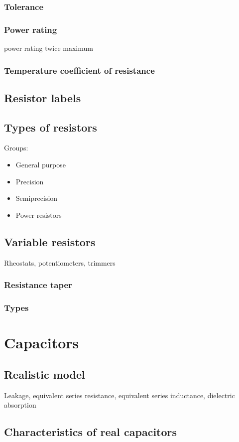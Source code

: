 \documentclass{report}
\begin{document}
\subsubsection{Tolerance}
\subsubsection{Power rating}
power rating twice maximum
\subsubsection{Temperature coefficient of resistance}
\subsection{Resistor labels}
\subsection{Types of resistors}
Groups:
\begin{itemize}
\item General purpose
\item Precision
\item Semiprecision
\item Power resistors
\end{itemize}
\subsection{Variable resistors}
Rheostats, potentiometers, trimmers
\subsubsection{Resistance taper}
\subsubsection{Types}
\section{Capacitors}
\subsection{Realistic model}
Leakage, equivalent series resistance, equivalent series inductance, dielectric absorption
\subsection{Characteristics of real capacitors}
\end{document}

